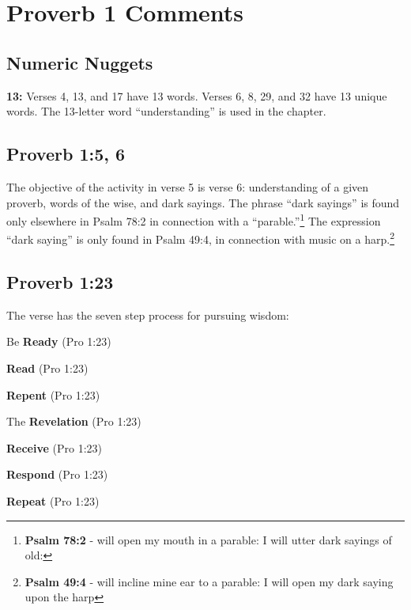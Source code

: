 \section{Proverb 1 Comments}

\subsection{Numeric Nuggets}
\textbf{13:} Verses 4, 13, and 17 have 13 words.  Verses 6, 8, 29, and 32 have 13 unique words. The 13-letter word ``understanding'' is used in the chapter.

\subsection{Proverb 1:5, 6}
The objective of the activity in verse 5 is verse 6: understanding of a given proverb, words of the wise, and dark sayings. The phrase ``dark sayings'' is found  only elsewhere in Psalm 78:2 in connection with a ``parable.''\footnote{\textbf{Psalm 78:2} -  will open my mouth in a parable: I will utter dark sayings of old:} The expression ``dark saying'' is only found in Psalm 49:4, in connection with music on a harp.\footnote{\textbf{Psalm 49:4} -  will incline mine ear to a parable: I will open my dark saying upon the harp}

\subsection{Proverb 1:23}
The verse has the seven step process for pursuing wisdom:
\begin{compactenum}[I.][7]
\item Be \textbf{Ready}  (Pro 1:23)
\item  \textbf{Read}  (Pro 1:23)
\item  \textbf{Repent}  (Pro 1:23)
\item The \textbf{Revelation}  (Pro 1:23)
\item  \textbf{Receive}  (Pro 1:23)
\item  \textbf{Respond}  (Pro 1:23)
\item  \textbf{Repeat}  (Pro 1:23)

\end{compactenum}


